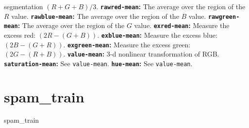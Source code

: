 \begin{datasetDescription}{segmentation}
{            \ensuremath{\left(R+G+B\right)/3}.\newline
        \textbf{\texttt{rawred-mean}:} The average over the region of the
            \ensuremath{R} value.\newline
        \textbf{\texttt{rawblue-mean}:} The average over the region of the
            \ensuremath{B} value.\newline
        \textbf{\texttt{rawgreen-mean}:} The average over the region of the
            \ensuremath{G} value.\newline
        \textbf{\texttt{exred-mean}:} Measure the excess red:
            \ensuremath{\left(2R-\left(G+B\right)\right)}.\newline
        \textbf{\texttt{exblue-mean}:} Measure the excess blue:
            \ensuremath{\left(2B-\left(G+R\right)\right)}.\newline
        \textbf{\texttt{exgreen-mean}:} Measure the excess green:
            \ensuremath{\left(2G-\left(R+B\right)\right)}.\newline
        \textbf{\texttt{value-mean}:} 3-d nonlinear transformation of RGB.
            \newline
        \textbf{\texttt{saturation-mean}:} See \texttt{value-mean}.\newline
        \textbf{\texttt{hue-mean}:} See \texttt{value-mean}.
    }
\end{datasetDescription}

\section{spam\_train}
\label{sec:datasets:spam_train}
\begin{datasetDescription}{spam_train}
\end{datasetDescription}

